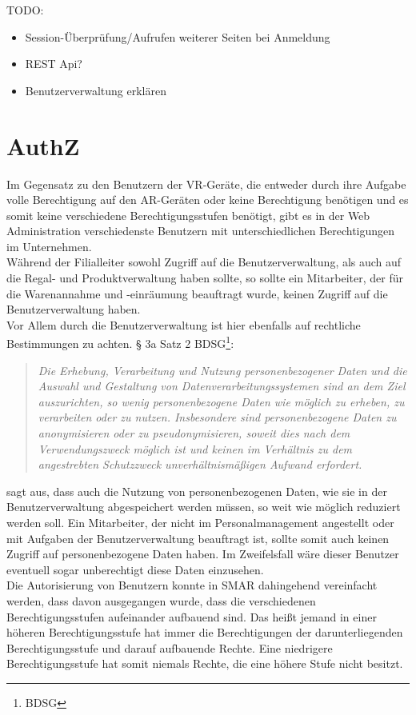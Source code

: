 TODO:
\begin{itemize}
	\item Session-Überprüfung/Aufrufen weiterer Seiten bei Anmeldung
	\item REST Api?
	\item Benutzerverwaltung erklären
\end{itemize}

\section{\acf{AuthZ}}
Im Gegensatz zu den Benutzern der \ac{VR}-Geräte, die entweder durch ihre Aufgabe volle Berechtigung auf den \ac{AR}-Geräten oder keine Berechtigung benötigen und es somit keine verschiedene Berechtigungsstufen benötigt, gibt es in der Web Administration verschiedenste Benutzern mit unterschiedlichen Berechtigungen im Unternehmen.\\
Während der Filialleiter sowohl Zugriff auf die Benutzerverwaltung, als auch auf die Regal- und Produktverwaltung haben sollte, so sollte ein Mitarbeiter, der für die Warenannahme und -einräumung beauftragt wurde, keinen Zugriff auf die Benutzerverwaltung haben.\\
Vor Allem durch die Benutzerverwaltung ist hier ebenfalls auf rechtliche Bestimmungen zu achten. § 3a Satz 2 \acs{BDSG}\footnote{\acf{BDSG}}:
\begin{quote}
	\glqq \textit{Die Erhebung, Verarbeitung und Nutzung personenbezogener Daten und die Auswahl und Gestaltung von Datenverarbeitungssystemen sind an dem Ziel auszurichten, so wenig personenbezogene Daten wie möglich zu erheben, zu verarbeiten oder zu nutzen. Insbesondere sind personenbezogene Daten zu anonymisieren oder zu pseudonymisieren, soweit dies nach dem Verwendungszweck möglich ist und keinen im Verhältnis zu dem angestrebten Schutzzweck unverhältnismäßigen Aufwand erfordert.}\grqq
\end{quote}
sagt aus, dass auch die Nutzung von personenbezogenen Daten, wie sie in der Benutzerverwaltung abgespeichert werden müssen, so weit wie möglich reduziert werden soll. Ein Mitarbeiter, der nicht im Personalmanagement angestellt oder mit Aufgaben der Benutzerverwaltung beauftragt ist, sollte somit auch keinen Zugriff auf personenbezogene Daten haben. Im Zweifelsfall wäre dieser Benutzer eventuell sogar unberechtigt diese Daten einzusehen.\\

Die Autorisierung von Benutzern konnte in \ac{SMAR} dahingehend vereinfacht werden, dass davon ausgegangen wurde, dass die verschiedenen Berechtigungsstufen aufeinander aufbauend sind. Das heißt jemand in einer höheren Berechtigungsstufe hat immer die Berechtigungen der darunterliegenden Berechtigungsstufe und darauf aufbauende Rechte. Eine niedrigere Berechtigungsstufe hat somit niemals Rechte, die eine höhere Stufe nicht besitzt.\\

